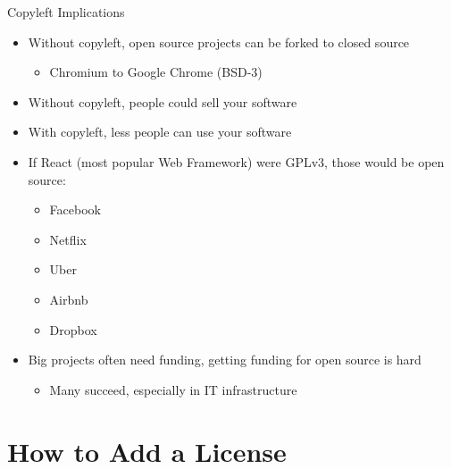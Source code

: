 \documentclass[compress,aspectratio=169]{beamer}
\begin{document}
  \begin{frame}{Copyleft Implications}
    \begin{itemize}
      \item Without copyleft, open source projects can be forked to closed source
        \begin{itemize}
          \item Chromium to Google Chrome (BSD-3)
        \end{itemize}
      \item Without copyleft, people could sell your software
      \item With copyleft, less people can use your software
      \item If React (most popular Web Framework) were GPLv3, those would be open source:
        \begin{itemize}
          \item Facebook
          \item Netflix
          \item Uber
          \item Airbnb
          \item Dropbox
        \end{itemize}
      \item Big projects often need funding, getting funding for open source is hard
        \begin{itemize}
          \item Many succeed, especially in IT infrastructure
        \end{itemize}
    \end{itemize}
  \end{frame}

\section{How to Add a License}
\end{document}
